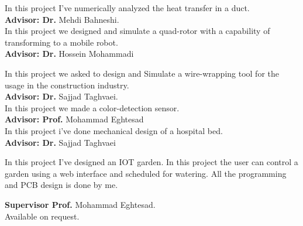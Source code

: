     
In this project I've numerically analyzed the heat transfer in a duct. \\
\textbf{Advisor: Dr.} Mehdi Bahneshi.\\ 
\vspace{5pt}
In this project we designed and simulate a quad-rotor with a capability of transforming to a mobile robot.\\
\textbf{Advisor: Dr.} Hossein Mohammadi\\
\vspace{5pt}

In this project we asked to design and Simulate a wire-wrapping tool for the usage in the construction industry.\\
\textbf{Advisor: Dr.} Sajjad Taghvaei.\\
\vspace{5pt} 
In this project we made a color-detection sensor.\\
\textbf{Advisor: Prof.} Mohammad Eghtesad\\
\vspace{5pt}
In this project i've done mechanical design of a hospital bed.\\
\textbf{Advisor: Dr.} Sajjad Taghvaei\\
\vspace{5pt}
\begin{small}
    In this project I've designed an IOT garden. In this project the user can control a garden using a web interface and scheduled for watering. All the programming and PCB design is done by me.\\
\end{small}
\textbf{Supervisor Prof.} Mohammad Eghtesad. \\
\vspace{5pt}
Available on request.
